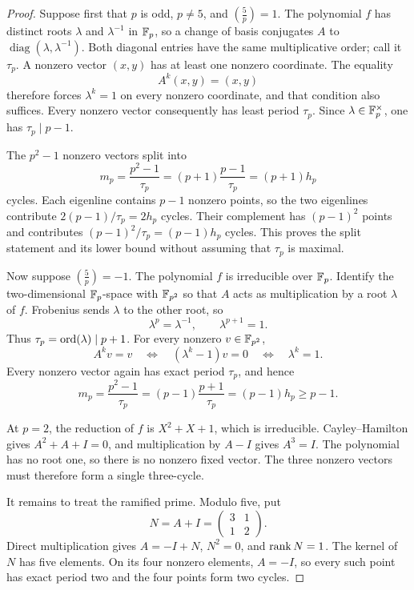 \documentclass[11pt]{article}
\theoremstyle{definition}
\theoremstyle{remark}
\begin{document}
\begin{proof}
Suppose first that \(p\) is odd, \(p\ne5\), and
\(\left(\frac5p\right)=1\).  The polynomial \(f\) has distinct roots
\(\lambda\) and \(\lambda^{-1}\) in \(\mathbb{F}_p\), so a change of basis
conjugates \(A\) to
\(\operatorname{diag}(\lambda,\lambda^{-1})\).  Both diagonal entries have
the same multiplicative order; call it \(\tau_p\).  A nonzero vector
\((x,y)\) has at least one nonzero coordinate.  The equality
\[
  A^k(x,y)=(x,y)
\]
therefore forces \(\lambda^k=1\) on every nonzero coordinate, and that
condition also suffices.  Every nonzero vector consequently has least period
\(\tau_p\).  Since \(\lambda\in\mathbb{F}_p^\times\), one has
\(\tau_p\mid p-1\).

The \(p^2-1\) nonzero vectors split into
\[
  m_p=\frac{p^2-1}{\tau_p}
      =(p+1)\frac{p-1}{\tau_p}=(p+1)h_p
\]
cycles.  Each eigenline contains \(p-1\) nonzero points, so the two
eigenlines contribute \(2(p-1)/\tau_p=2h_p\) cycles.  Their complement has
\((p-1)^2\) points and contributes
\((p-1)^2/\tau_p=(p-1)h_p\) cycles.  This proves the split statement and its
lower bound without assuming that \(\tau_p\) is maximal.

Now suppose \(\left(\frac5p\right)=-1\).  The polynomial \(f\) is
irreducible over \(\mathbb{F}_p\).  Identify the two-dimensional \(\mathbb{F}_p\)-space
with \(\mathbb{F}_{p^2}\) so that \(A\) acts as multiplication by a root
\(\lambda\) of \(f\).  Frobenius sends \(\lambda\) to the other root, so
\[
  \lambda^p=\lambda^{-1},\qquad \lambda^{p+1}=1.
\]
Thus \(\tau_p=\operatorname{ord}(\lambda)\mid p+1\).  For every nonzero
\(v\in\mathbb{F}_{p^2}\),
\[
  A^kv=v
  \quad\Longleftrightarrow\quad
  (\lambda^k-1)v=0
  \quad\Longleftrightarrow\quad
  \lambda^k=1.
\]
Every nonzero vector again has exact period \(\tau_p\), and hence
\[
  m_p=\frac{p^2-1}{\tau_p}
      =(p-1)\frac{p+1}{\tau_p}=(p-1)h_p\ge p-1.
\]

At \(p=2\), the reduction of \(f\) is \(X^2+X+1\), which is irreducible.
Cayley--Hamilton gives \(A^2+A+I=0\), and multiplication by \(A-I\) gives
\(A^3=I\).  The polynomial has no root one, so there is no nonzero fixed
vector.  The three nonzero vectors must therefore form a single
three-cycle.

It remains to treat the ramified prime.  Modulo five, put
\begin{equation}
  N=A+I=\begin{pmatrix}3&1\\1&2\end{pmatrix}.
  \label{eq:nilpotent-N}
\end{equation}
Direct multiplication gives
\(A=-I+N\), \(N^2=0\), and \(\operatorname{rank} N=1\).  The kernel of \(N\) has five
elements.  On its four nonzero elements, \(A=-I\), so every such point has
exact period two and the four points form two cycles.


\end{proof}
\end{document}
